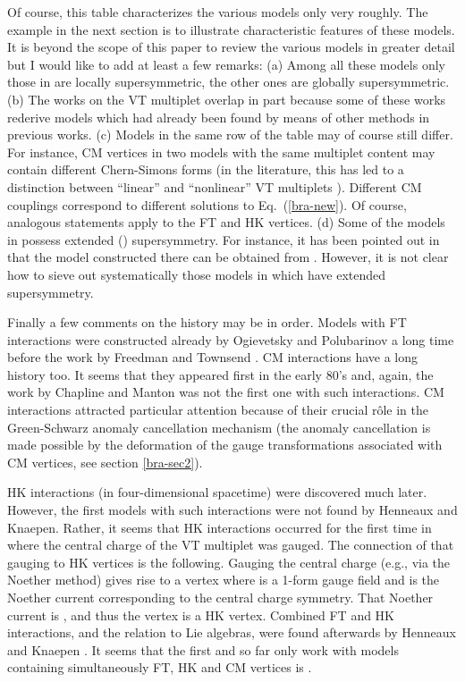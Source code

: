 \documentclass[a4paper,12pt]{article}
\begin{document}
Of course, this table characterizes the various models
only very roughly. 
The example in the next section is to illustrate characteristic
features of these models. It is beyond the scope of this
paper to review the various models in 
greater detail but I would like to add
at least a few remarks: (a) Among all these models
only those in \cite{bra-7} are locally supersymmetric, the
other ones are globally supersymmetric.
(b) The works on the VT multiplet
overlap in part because some of these
works rederive models which had already been found
by means of other methods in previous works.
(c) Models in the same row of the table may of course still differ. 
For instance,
CM vertices in two models with the same multiplet content 
may contain different Chern-Simons forms
(in the literature,
this has led to a distinction between
``linear'' and ``nonlinear'' VT multiplets \cite{bra-2}).
Different CM couplings
correspond to different solutions
to Eq.\ (\ref{bra-new}). Of course, analogous statements apply to the
FT and HK vertices.
(d) Some of the models
in \cite{bra-11} possess extended (\coordHE{})
supersymmetry. For instance, 
it has been pointed out in \cite{bra-12} that the model constructed
there can be obtained from \cite{bra-11}. 
However, it is not clear how to sieve out systematically
those models in \cite{bra-11} which have extended supersymmetry.

Finally a few comments on the history may be in order.
Models with FT interactions were constructed already
by Ogievetsky and Polubarinov \cite{bra-OP} a long time
before the work by Freedman and Townsend \cite{bra-FT}.
CM interactions have a long history too. It seems that
they appeared first
in the early 80's \cite{bra-NT,bra-Bergshoeff,bra-CM} and, again,
the work by Chapline and Manton was not the first 
one with such interactions.
CM interactions attracted particular attention because of their
crucial r\^ole in the Green-Schwarz anomaly cancellation
mechanism \cite{bra-GS} (the anomaly cancellation
is made possible by the deformation
of the gauge transformations
associated with CM vertices, see section \ref{bra-sec2}).

HK interactions (in four-dimensional spacetime)
were discovered much later. However, the first models 
with such interactions were
not found by Henneaux and Knaepen. Rather,
it seems that HK interactions occurred for the first time in
\cite{bra-1} where the central charge of the VT multiplet
was gauged. The connection of that gauging to HK vertices 
is the following.
Gauging the central charge (e.g., via the Noether method) 
gives rise to
a vertex \coordHE{} where \coordHE{} is
a 1-form gauge field and \coordHE{} is the Noether current
corresponding to the central charge symmetry. 
That Noether current is \coordHE{},
and thus the vertex \coordHE{} is a HK vertex.
Combined FT and HK interactions, and
the relation to Lie algebras, were found afterwards
by Henneaux and Knaepen \cite{bra-HK1}.
It seems that the first and so far only work with models
containing simultaneously FT, HK and CM vertices
is \cite{bra-11}.
\end{document}
